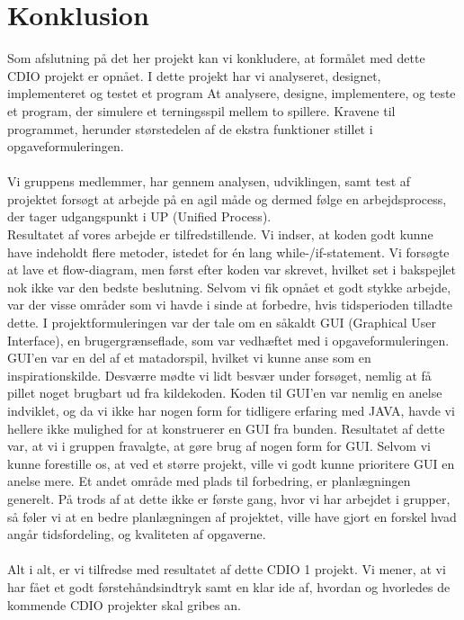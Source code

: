 \chapter{Konklusion}

Som afslutning på det her projekt kan vi konkludere, at formålet med dette CDIO projekt er opnået. 
I dette projekt har vi analyseret, designet, implementeret og testet et program
At analysere, designe, implementere, og teste et program, der simulere et terningsspil mellem to spillere.
Kravene til programmet, herunder størstedelen af de ekstra funktioner stillet i opgaveformuleringen.
\\
\\
Vi gruppens medlemmer, har gennem analysen, udviklingen, samt test af projektet forsøgt at arbejde på en agil måde og dermed følge en arbejdsprocess, der tager udgangspunkt i UP (Unified Process).
\\
Resultatet af vores arbejde er tilfredstillende.
Vi indser, at koden godt kunne have indeholdt flere metoder, istedet for én lang while-/if-statement.
Vi forsøgte at lave et flow-diagram, men først efter koden var skrevet, hvilket set i bakspejlet nok ikke var den bedste beslutning.
Selvom vi fik opnået et godt stykke arbejde, var der visse områder som vi havde i sinde at forbedre, hvis tidsperioden tilladte dette.
I projektformuleringen var der tale om en såkaldt GUI (Graphical User Interface), en brugergrænseflade, som var vedhæftet med i opgaveformuleringen.
GUI’en var en del af et matadorspil, hvilket vi kunne anse som en inspirationskilde.
Desværre mødte vi lidt besvær under forsøget, nemlig at få pillet noget brugbart ud fra kildekoden.
Koden til GUI’en var nemlig en anelse indviklet, og da vi ikke har nogen form for tidligere erfaring med JAVA, havde vi hellere ikke mulighed for at konstruerer en GUI fra bunden.
Resultatet af dette var, at vi i gruppen fravalgte, at gøre brug af nogen form for GUI.
Selvom vi kunne forestille os, at ved et større projekt, ville vi godt kunne prioritere GUI en anelse mere.
Et andet område med plads til forbedring, er planlægningen generelt. 
På trods af at dette ikke er første gang, hvor vi har arbejdet i grupper, så føler vi at en bedre planlægningen af projektet, ville have gjort en forskel hvad angår tidsfordeling, og kvaliteten af opgaverne.
\\
\\
Alt i alt, er vi tilfredse med resultatet af dette CDIO 1 projekt.
Vi mener, at vi har fået et godt førstehåndsindtryk samt en klar ide af, hvordan og hvorledes de kommende CDIO projekter skal gribes an.

